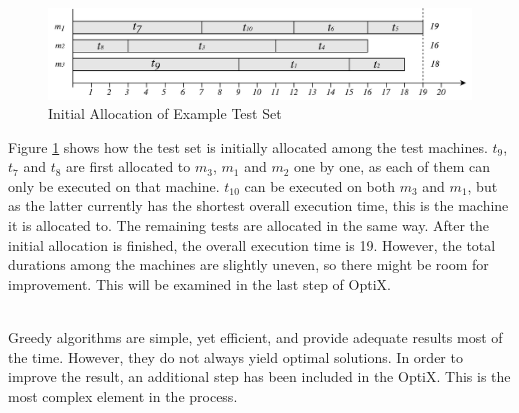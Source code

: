 \begin{figure}[h]
    \centering
    \includegraphics[width=\textwidth]{figures/new/initial_allocation2.pdf}
    \caption{Initial Allocation of Example Test Set}
    \label{fig.initial_allocation}
\end{figure}

Figure \ref{fig.initial_allocation} shows how the test set is initially allocated among the test machines. $t_{9}$, $t_{7}$ and $t_{8}$ are first allocated to $m_{3}$, $m_{1}$ and $m_{2}$ one by one, as each of them can only be executed on that machine. $t_{10}$ can be executed on both $m_{3}$ and $m_{1}$, but as the latter currently has the shortest overall execution time, this is the machine it is allocated to. The remaining tests are allocated in the same way. After the initial allocation is finished, the overall execution time is 19. However, the total durations among the machines are slightly uneven, so there might be room for improvement. This will be examined in the last step of OptiX.






\vspace{7px}
\noindent \textbf{}\\
\noindent Greedy algorithms are simple, yet efficient, and provide adequate results most of the time. However, they do not always yield optimal solutions. In order to improve the result, an additional step has been included in the OptiX. This is the most complex element in the process.

